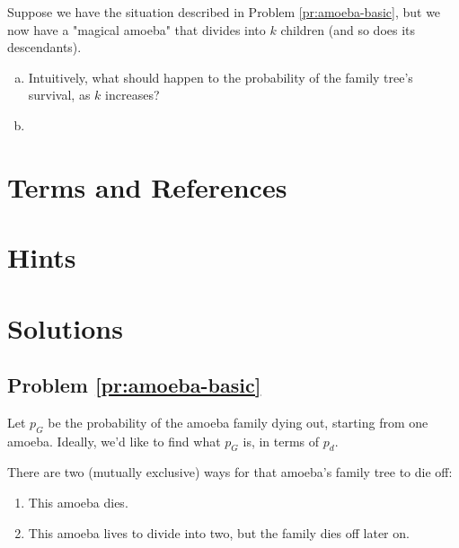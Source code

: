 \begin{problem}
\label{pr:amoeba-ndesc}
Suppose we have the situation described in Problem \ref{pr:amoeba-basic}, but we now have a "magical amoeba" that divides into $k$ children (and so does its descendants). 

\begin{enumerate}[(a)]
\item Intuitively, what should happen to the probability of the family tree's survival, as $k$ increases?
\item 
\end{enumerate}
\end{problem}

\newpage
\section{Terms and References}

\section{Hints}

\newpage
\section{Solutions}

\subsection{Problem \ref{pr:amoeba-basic}}

Let $p_G$ be the probability of the amoeba family dying out, starting from one amoeba. Ideally, we'd like to find what $p_G$ is, in terms of $p_d$. 

There are two (mutually exclusive) ways for that amoeba's family tree to die off: 
\begin{enumerate}
\item This amoeba dies.
\item This amoeba lives to divide into two, but the family dies off later on.
\end{enumerate}



